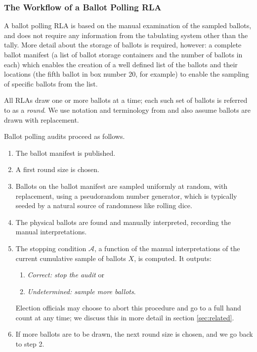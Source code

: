 \subsubsection{The Workflow of a Ballot Polling RLA}
\label{sec:polling}
A ballot polling RLA \cite{RLA} is based on the manual examination of the sampled ballots, and does not require any information from the tabulating system other than the tally. 
More detail about the storage of ballots is required, however: a complete ballot manifest (a list of ballot storage containers and the number of ballots in each) which enables the creation of a well defined list of the ballots and their locations (the fifth ballot in box number 20, for example) to enable the sampling of specific ballots from the list. 

All RLAs draw one or more ballots at a time; each such set of ballots is referred to as a {\em round}. We use notation and terminology from \cite{usenix_minerva,arxiv_athena,simulations,bravo} and also assume ballots are drawn with replacement. 

Ballot polling audits proceed as follows. 
\begin{enumerate}
\item The ballot manifest is published. 
\item A first round size \cite{usenix_minerva} is chosen. %
\item Ballots on the ballot manifest are sampled uniformly at random, with replacement, using a pseudorandom number generator, which is typically seeded by a natural source of randomness like rolling dice.
\item The physical ballots are found and manually interpreted, recording the manual interpretations. 
\item The stopping condition $\mathcal{A}$, a function of the manual interpretations of the current cumulative sample of ballots $X$, is computed. It outputs: 
\begin{enumerate}
\item \emph{Correct: stop the audit} or 
\item \emph{Undetermined: sample more ballots}. 
\end{enumerate}
Election officials may choose to abort this procedure and go to a full hand count at any time; we discuss this in more detail in section \ref{sec:related}.  
\item If more ballots are to be drawn, the next round size is chosen, and we go back to step 2. 
\end{enumerate} 

